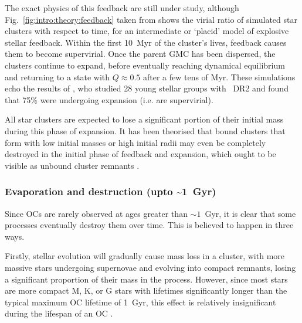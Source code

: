 The exact physics of this feedback are still under study, although Fig.~\ref{fig:intro:theory:feedback} taken from \cite{banerjee_how_2017} shows the virial ratio of simulated star clusters with respect to time, for an intermediate or `placid' model of explosive stellar feedback. Within the first 10~Myr of the cluster's lives, feedback causes them to become supervirial. Once the parent GMC has been dispersed, the clusters continue to expand, before eventually reaching dynamical equilibrium and returning to a state with $Q\approx0.5$ after a few tens of Myr. These simulations echo the results of \cite{kuhn_kinematics_2019}, who studied 28 young stellar groups with \gaia\ DR2 and found that 75\% were undergoing expansion (i.e. are supervirial). 

All star clusters are expected to lose a significant portion of their initial mass during this phase of expansion. It has been theorised that bound clusters that form with low initial masses or high initial radii may even be completely destroyed in the initial phase of feedback and expansion, which ought to be visible as unbound cluster remnants \citep{krause_physics_2020}.


\subsubsection{Evaporation and destruction (upto \textasciitilde1~Gyr)}

Since OCs are rarely observed at ages greater than $\sim1$~Gyr, it is clear that some processes eventually destroy them over time. This is believed to happen in three ways.

Firstly, stellar evolution will gradually cause mass loss in a cluster, with more massive stars undergoing supernovae and evolving into compact remnants, losing a significant proportion of their mass in the process. However, since most stars are more compact M, K, or G stars with lifetimes significantly longer than the typical maximum OC lifetime of 1~Gyr, this effect is relatively insignificant during the lifespan of an OC \citep{krause_physics_2020}.

